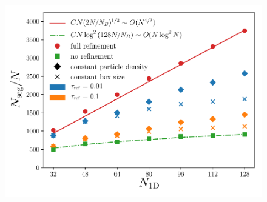 \documentclass[fleq,usenatbib]{mnras}
\begin{document}
\subsection{}
\begin{figure}
\includegraphics[width=1\linewidth]{Figures/particle_scaling.pdf}
\caption{}
\label{fig:pscale}
\end{figure}
\end{document}
